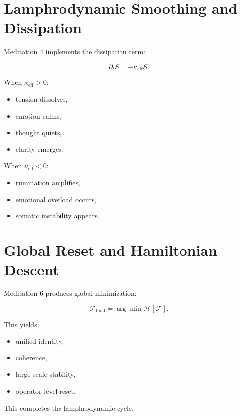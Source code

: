 \documentclass[12pt]{article}
\begin{document}
\section{Lamphrodynamic Smoothing and Dissipation}

Meditation 4 implements the dissipation term:

\[
\partial_t S = -\kappa_{\mathrm{eff}} S.
\]

When $\kappa_{\mathrm{eff}} > 0$:

\begin{itemize}
    \item tension dissolves,
    \item emotion calms,
    \item thought quiets,
    \item clarity emerges.
\end{itemize}

When $\kappa_{\mathrm{eff}} < 0$:

\begin{itemize}
    \item rumination amplifies,
    \item emotional overload occurs,
    \item somatic instability appears.
\end{itemize}

\section{Global Reset and Hamiltonian Descent}

Meditation 6 produces global minimization:

\[
\mathcal{F}_{\mathrm{final}} = \arg\min\mathcal{H}[\mathcal{F}].
\]

This yields:

\begin{itemize}
    \item unified identity,
    \item coherence,
    \item large-scale stability,
    \item operator-level reset.
\end{itemize}

This completes the lamphrodynamic cycle.

\newpage

\end{document}
